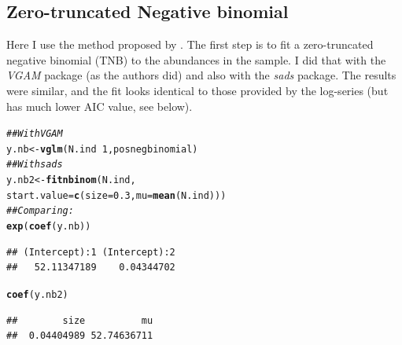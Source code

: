 \documentclass[12pt, A4]{article}\usepackage[]{graphicx}\usepackage[]{color}
\makeatletter
\newcommand{\hlnum}[1]{\textcolor[rgb]{0.686,0.059,0.569}{#1}}%
\newcommand{\hlcom}[1]{\textcolor[rgb]{0.678,0.584,0.686}{\textit{#1}}}%
\newcommand{\hlopt}[1]{\textcolor[rgb]{0,0,0}{#1}}%
\newcommand{\hlstd}[1]{\textcolor[rgb]{0.345,0.345,0.345}{#1}}%
\newcommand{\hlkwb}[1]{\textcolor[rgb]{0.69,0.353,0.396}{#1}}%
\newcommand{\hlkwc}[1]{\textcolor[rgb]{0.333,0.667,0.333}{#1}}%
\newcommand{\hlkwd}[1]{\textcolor[rgb]{0.737,0.353,0.396}{\textbf{#1}}}%
\newenvironment{kframe}{%
 \def\at@end@of@kframe{}%
 \ifinner\ifhmode%
  \def\at@end@of@kframe{\end{minipage}}%
  \begin{minipage}{\columnwidth}%
 \fi\fi%
 \def\FrameCommand##1{\hskip\@totalleftmargin \hskip-\fboxsep
 \colorbox{shadecolor}{##1}\hskip-\fboxsep
     \hskip-\linewidth \hskip-\@totalleftmargin \hskip\columnwidth}%
 \MakeFramed {\advance\hsize-\width
   \@totalleftmargin\z@ \linewidth\hsize
   \@setminipage}}%
 {\par\unskip\endMakeFramed%
 \at@end@of@kframe}
\newenvironment{knitrout}{}{} %
\makeatother
\begin{document}
\subsection*{Zero-truncated Negative binomial}
\label{sec:negbin}

Here I use the method proposed by \citet{tovo2017}. The first step is
to fit a zero-truncated negative binomial (TNB) to the abundances in the sample.
I did that with the \emph{VGAM} package (as the authors did)
and also with the \emph{sads} package. 
The results were similar, and the fit looks identical to
those provided by the log-series (but has much lower AIC value, see below).
 
\begin{knitrout}
\color{fgcolor}\begin{kframe}
\begin{alltt}
\hlcom{## With VGAM}
\hlstd{y.nb} \hlkwb{<-} \hlkwd{vglm}\hlstd{(N.ind} \hlopt{~} \hlnum{1}\hlstd{, posnegbinomial)}
\hlcom{## With sads}
\hlstd{y.nb2} \hlkwb{<-} \hlkwd{fitnbinom}\hlstd{(N.ind,}
                   \hlkwc{start.value}\hlstd{=}\hlkwd{c}\hlstd{(}\hlkwc{size}\hlstd{=}\hlnum{0.3}\hlstd{,} \hlkwc{mu}\hlstd{=}\hlkwd{mean}\hlstd{(N.ind)))}
\hlcom{## Comparing: }
\hlkwd{exp}\hlstd{(}\hlkwd{coef}\hlstd{(y.nb))}
\end{alltt}
\begin{verbatim}
## (Intercept):1 (Intercept):2 
##   52.11347189    0.04344702
\end{verbatim}
\begin{alltt}
\hlkwd{coef}\hlstd{(y.nb2)}
\end{alltt}
\begin{verbatim}
##        size          mu 
##  0.04404989 52.74636711
\end{verbatim}
\end{kframe}
\end{knitrout}
\end{document}
